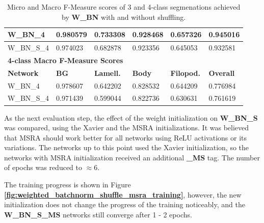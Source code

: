 \begin {table}
\begin{flushleft}
\begin {tabular}[!htb]{|l|l|l|l|l|l|}
			W\_BN\_4& \cellcolor{green!25}0.980579& \cellcolor{green!25}0.733308& \cellcolor{green!25}0.928468& \cellcolor{green!25}0.657326& \cellcolor{green!25}0.945016 \\ \hline
			W\_BN\_S\_4& 0.974023& 0.682878& 0.923356& 0.645053& 0.932581 \\ \hline
			\multicolumn{6}{|l|}{\textbf{4-class Macro F-Measure Scores}} \\ \hline
			\textbf{Network}& \textbf{BG}& \textbf{Lamell.}& \textbf{Body}& \textbf{Filopod.}& \textbf{Overall} \\ \hline
			W\_BN\_4& \cellcolor{green!25}0.978607& \cellcolor{green!25}0.642202& \cellcolor{green!25}0.828532& \cellcolor{green!25}0.644209& \cellcolor{green!25}0.776984 \\ \hline
			W\_BN\_S\_4& 0.971439& 0.599044& 0.822736& 0.630631& 0.761619 \\ \hline
		\end {tabular}
	\end {flushleft}

\caption[Micro and Macro F-Measure scores for a network with Batch Normalization and with or without shuffling.]{Micro and Macro F-Measure scores of 3 and 4-class segmenations achieved by \textbf{W\_BN} with and without shuffling.}
\label{tab:results3}
\end {table}


\noindent As the next evaluation step, the effect of the weight initialization on \textbf{W\_BN\_S} was compared, using the Xavier and the MSRA initializations. It was believed that MSRA should work better for all networks using ReLU activations or its variations. The networks up to this point used the Xavier initialization, so the networks with MSRA initialization received an additional \textbf{\_MS} tag. The number of epochs was reduced to $\approx$6.

The training progress is shown in Figure \textbf{\ref{fig:weighted_batchnorm_shuffle_msra_training}}, however, the new initialization does not change the progress of the training noticeably, and the \textbf{W\_BN\_S\_MS} networks still converge after 1 - 2 epochs.\\

